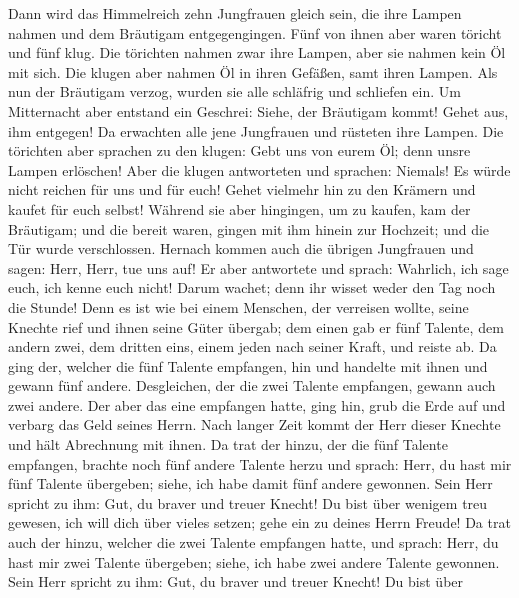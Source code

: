 Dann wird das Himmelreich zehn Jungfrauen gleich sein,
die ihre Lampen nahmen und dem Bräutigam entgegengingen. 
Fünf von ihnen aber waren töricht und fünf klug.  Die
törichten nahmen zwar ihre Lampen, aber sie nahmen kein Öl mit sich.
 Die klugen aber nahmen Öl in ihren Gefäßen, samt ihren
Lampen.  Als nun der Bräutigam verzog, wurden sie alle
schläfrig und schliefen ein.  Um Mitternacht aber entstand
ein Geschrei: Siehe, der Bräutigam kommt! Gehet aus, ihm entgegen!
 Da erwachten alle jene Jungfrauen und rüsteten ihre
Lampen.  Die törichten aber sprachen zu den klugen: Gebt
uns von eurem Öl; denn unsre Lampen erlöschen!  Aber die
klugen antworteten und sprachen: Niemals! Es würde nicht reichen für uns
und für euch! Gehet vielmehr hin zu den Krämern und kaufet für euch
selbst!  Während sie aber hingingen, um zu kaufen, kam
der Bräutigam; und die bereit waren, gingen mit ihm hinein zur Hochzeit;
und die Tür wurde verschlossen.  Hernach kommen auch die
übrigen Jungfrauen und sagen: Herr, Herr, tue uns auf! 
Er aber antwortete und sprach: Wahrlich, ich sage euch, ich kenne euch
nicht!  Darum wachet; denn ihr wisset weder den Tag noch
die Stunde!  Denn es ist wie bei einem Menschen, der
verreisen wollte, seine Knechte rief und ihnen seine Güter übergab;
 dem einen gab er fünf Talente, dem andern zwei, dem
dritten eins, einem jeden nach seiner Kraft, und reiste ab.
 Da ging der, welcher die fünf Talente empfangen, hin und
handelte mit ihnen und gewann fünf andere.  Desgleichen,
der die zwei Talente empfangen, gewann auch zwei andere. 
Der aber das eine empfangen hatte, ging hin, grub die Erde auf und
verbarg das Geld seines Herrn.  Nach langer Zeit kommt
der Herr dieser Knechte und hält Abrechnung mit ihnen. 
Da trat der hinzu, der die fünf Talente empfangen, brachte noch fünf
andere Talente herzu und sprach: Herr, du hast mir fünf Talente
übergeben; siehe, ich habe damit fünf andere gewonnen. 
Sein Herr spricht zu ihm: Gut, du braver und treuer Knecht! Du bist über
wenigem treu gewesen, ich will dich über vieles setzen; gehe ein zu
deines Herrn Freude!  Da trat auch der hinzu, welcher die
zwei Talente empfangen hatte, und sprach: Herr, du hast mir zwei Talente
übergeben; siehe, ich habe zwei andere Talente gewonnen. 
Sein Herr spricht zu ihm: Gut, du braver und treuer Knecht! Du bist über
